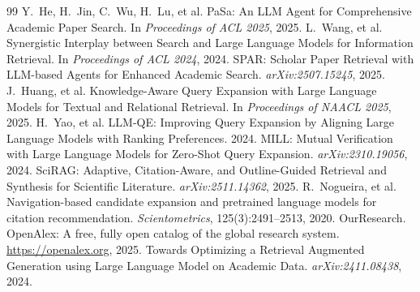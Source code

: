 \documentclass[11pt,a4paper,fontset=macnew]{ctexart}
\begin{document}
\begin{thebibliography}{99}
 Y.~He, H.~Jin, C.~Wu, H.~Lu, et al. PaSa: An LLM Agent for Comprehensive Academic Paper Search. In \emph{Proceedings of ACL 2025}, 2025.
 L.~Wang, et al. Synergistic Interplay between Search and Large Language Models for Information Retrieval. In \emph{Proceedings of ACL 2024}, 2024.
 SPAR: Scholar Paper Retrieval with LLM-based Agents for Enhanced Academic Search. \emph{arXiv:2507.15245}, 2025.
 J.~Huang, et al. Knowledge-Aware Query Expansion with Large Language Models for Textual and Relational Retrieval. In \emph{Proceedings of NAACL 2025}, 2025.
 H.~Yao, et al. LLM-QE: Improving Query Expansion by Aligning Large Language Models with Ranking Preferences. 2024.
 MILL: Mutual Verification with Large Language Models for Zero-Shot Query Expansion. \emph{arXiv:2310.19056}, 2024.
 SciRAG: Adaptive, Citation-Aware, and Outline-Guided Retrieval and Synthesis for Scientific Literature. \emph{arXiv:2511.14362}, 2025.
 R.~Nogueira, et al. Navigation-based candidate expansion and pretrained language models for citation recommendation. \emph{Scientometrics}, 125(3):2491--2513, 2020.
 OurResearch. OpenAlex: A free, fully open catalog of the global research system. \url{https://openalex.org}, 2025.
 Towards Optimizing a Retrieval Augmented Generation using Large Language Model on Academic Data. \emph{arXiv:2411.08438}, 2024.
\end{thebibliography}
\end{document}
